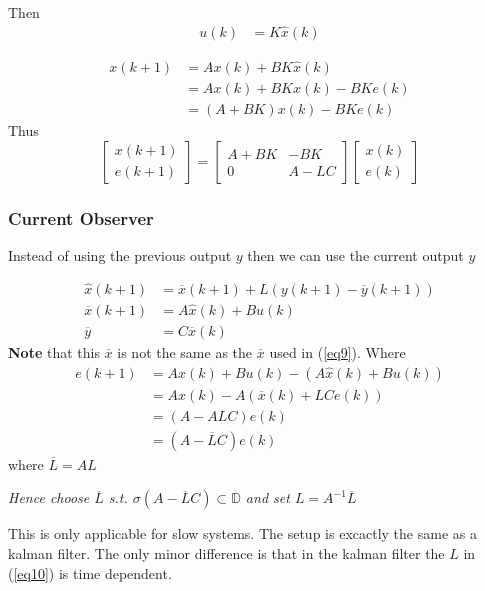 \documentclass[a4paper]{article}
\begin{document}
Then
\begin{align}
	u(k) &= K \hat{x}(k)
\end{align}

\begin{align}
x(k+1) &=  A x(k) + B K \hat{x}(k) \\
	   &= A x(k) + B K x(k) - B K e(k) \\
	   &= (A + B K) x(k) - B K e(k)
\end{align}
Thus 
\begin{equation}
\begin{bmatrix}
x(k+1) \\
e(k+1)
\end{bmatrix}  = \begin{bmatrix}
A + B K & - B K \\
0 & A - L C
\end{bmatrix} \begin{bmatrix}
x(k) \\
e(k)
\end{bmatrix} 
\end{equation}

\subsubsection{Current Observer}
Instead of using the previous output $ y $ then we can use the current output  $ y $

\begin{align}
	\hat{x}(k+1) &=  \overline{x}(k+1) + L(y(k+1) - \overline{y}(k+1))\label{eq10} \\
\overline{x}(k+1) &= A \hat{x}(k) + B u(k)	\\
\overline{y} &= C \overline{x} (k)
\end{align}
\textbf{Note} that this $ \overline{x} $ is not the same as the $ \overline{x} $ used in (\ref{eq9}).
Where 
\begin{align}
e(k+1) &= A x(k) + B u(k) - (A \hat{x}(k) + B u(k)) \\
	   &= A x(k) - A ( \overline{x}(k) + L C e(k) ) \\
	   &= (A - A L C)e(k) \\
	   &= (A - \overline{L} C) e(k)
\end{align}
where $ \overline{L} = A L $

\textit{Hence choose  $ \overline{L} $ s.t. $ \sigma(A - \overline{L} C) \subset \mathbb{D} $ and set $ L = A^{-1} \overline{L} $} 

This is only applicable for slow systems. 
The setup is excactly the same as a kalman filter. The only minor difference is that in the kalman filter the $ L $ in (\ref{eq10}) is time dependent. 
\end{document}

